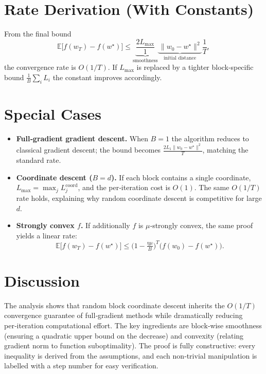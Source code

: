 \documentclass{article}
\newcommand{\E}{\mathbb{E}}
\begin{document}
\section*{Rate Derivation (With Constants)}

From the final bound
\[
\E\!\bigl[f(w_{T})-f(w^{\star})\bigr]\le
\underbrace{\frac{2L_{\max}}{1}}_{\text{smoothness}}
\underbrace{\,\|w_{0}-w^{\star}\|^{2}}_{\text{initial distance}}
\frac{1}{T},
\]
the convergence rate is $O(1/T)$.  
If $L_{\max}$ is replaced by a tighter block‑specific bound
$\frac{1}{B}\sum_{i}L_{i}$ the constant improves accordingly.

\section*{Special Cases}

\begin{itemize}[leftmargin=*]
\item \textbf{Full‑gradient gradient descent.}
When $B=1$ the algorithm reduces to classical gradient descent; the bound
becomes $\frac{2L_{1}\|w_{0}-w^{\star}\|^{2}}{T}$, matching the standard
rate.
\item \textbf{Coordinate descent ($B=d$).}
If each block contains a single coordinate, $L_{\max}=\max_{j}L_{j}^{\text{coord}}$,
and the per‑iteration cost is $O(1)$. The same $O(1/T)$ rate holds,
explaining why random coordinate descent is competitive for large $d$.
\item \textbf{Strongly convex $f$.}
If additionally $f$ is $\mu$‑strongly convex, the same proof yields a
linear rate:
\[
\E\!\bigl[f(w_{T})-f(w^{\star})\bigr]\le
\bigl(1-\tfrac{\eta\mu}{B}\bigr)^{T}\bigl(f(w_{0})-f(w^{\star})\bigr).
\]
\end{itemize}

\section*{Discussion}

The analysis shows that random block coordinate descent inherits the
$O(1/T)$ convergence guarantee of full‑gradient methods while
dramatically reducing per‑iteration computational effort. The key
ingredients are block‑wise smoothness (ensuring a quadratic upper
bound on the decrease) and convexity (relating gradient norm to
function suboptimality). The proof is fully constructive: every
inequality is derived from the assumptions, and each non‑trivial
manipulation is labelled with a step number for easy verification.
\end{document}
